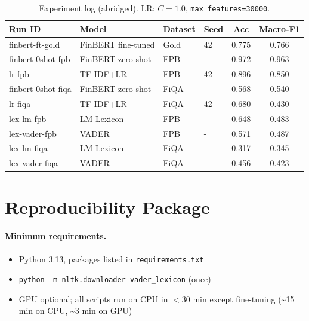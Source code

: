 \documentclass[11pt]{article}
\begin{document}
\begin{table}[h]
\centering
\scriptsize
\begin{tabular}{llllcc}
\toprule
\textbf{Run ID} & \textbf{Model} & \textbf{Dataset} & \textbf{Seed} & \textbf{Acc} & \textbf{Macro-F1} \\
\midrule
finbert-ft-gold & FinBERT fine-tuned & Gold & 42 & 0.775 & 0.766 \\
finbert-0shot-fpb & FinBERT zero-shot & FPB & - & 0.972 & 0.963 \\
lr-fpb & TF-IDF+LR & FPB & 42 & 0.896 & 0.850 \\
finbert-0shot-fiqa & FinBERT zero-shot & FiQA & - & 0.568 & 0.540 \\
lr-fiqa & TF-IDF+LR & FiQA & 42 & 0.680 & 0.430 \\
lex-lm-fpb & LM Lexicon & FPB & - & 0.648 & 0.483 \\
lex-vader-fpb & VADER & FPB & - & 0.571 & 0.487 \\
lex-lm-fiqa & LM Lexicon & FiQA & - & 0.317 & 0.345 \\
lex-vader-fiqa & VADER & FiQA & - & 0.456 & 0.423 \\
\bottomrule
\end{tabular}
\caption{Experiment log (abridged). LR: $C=1.0$, \texttt{max\_features=30000}.}
\label{tab:explog}
\end{table}

\section{Reproducibility Package}
\label{app:repro}

\paragraph{Minimum requirements.}
\begin{itemize}
  \item Python 3.13, packages listed in \texttt{requirements.txt}
  \item \texttt{python -m nltk.downloader vader\_lexicon} (once)
  \item GPU optional; all scripts run on CPU in $<$30 min except fine-tuning
    (\textasciitilde 15 min on CPU, \textasciitilde 3 min on GPU)
\end{itemize}
\end{document}
